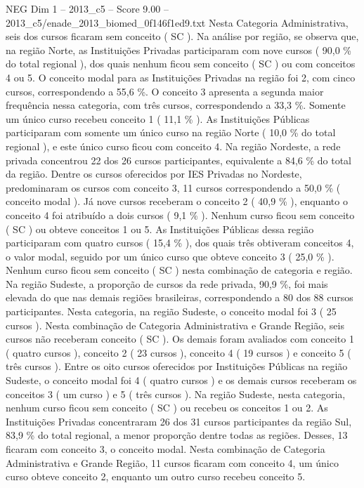 \begin{textsample}{NEG Dim 1 – 2013\_c5 – Score 9.00 – 2013\_c5/enade\_2013\_biomed\_0f146f1ed9.txt}
Nesta Categoria Administrativa, seis dos cursos ficaram sem conceito ( SC ).
Na análise por região, se observa que, na região Norte, as Instituições Privadas participaram com nove cursos ( 90,0 \% do total regional ), dos quais nenhum ficou sem conceito ( SC ) ou com conceitos 4 ou 5.
O conceito modal para as Instituições Privadas na região foi 2, com cinco cursos, correspondendo a 55,6 \%.
O conceito 3 apresenta a segunda maior frequência nessa categoria, com três cursos, correspondendo a 33,3 \%.
Somente um único curso recebeu conceito 1 ( 11,1 \% ).
As Instituições Públicas participaram com somente um único curso na região Norte ( 10,0 \% do total regional ), e este único curso ficou com conceito 4.
Na região Nordeste, a rede privada concentrou 22 dos 26 cursos participantes, equivalente a 84,6 \% do total da região.
Dentre os cursos oferecidos por IES Privadas no Nordeste, predominaram os cursos com conceito 3, 11 cursos correspondendo a 50,0 \% ( conceito modal ).
Já nove cursos receberam o conceito 2 ( 40,9 \% ), enquanto o conceito 4 foi atribuído a dois cursos ( 9,1 \% ).
Nenhum curso ficou sem conceito ( SC ) ou obteve conceitos 1 ou 5.
As Instituições Públicas dessa região participaram com quatro cursos ( 15,4 \% ), dos quais três obtiveram conceitos 4, o valor modal, seguido por um único curso que obteve conceito 3 ( 25,0 \% ).
Nenhum curso ficou sem conceito ( SC ) nesta combinação de categoria e região.
Na região Sudeste, a proporção de cursos da rede privada, 90,9 \%, foi mais elevada do que nas demais regiões brasileiras, correspondendo a 80 dos 88 cursos participantes.
Nesta categoria, na região Sudeste, o conceito modal foi 3 ( 25 cursos ).
Nesta combinação de Categoria Administrativa e Grande Região, seis cursos não receberam conceito ( SC ).
Os demais foram avaliados com conceito 1 ( quatro cursos ), conceito 2 ( 23 cursos ), conceito 4 ( 19 cursos ) e conceito 5 ( três cursos ).
Entre os oito cursos oferecidos por Instituições Públicas na região Sudeste, o conceito modal foi 4 ( quatro cursos ) e os demais cursos receberam os conceitos 3 ( um curso ) e 5 ( três cursos ).
Na região Sudeste, nesta categoria, nenhum curso ficou sem conceito ( SC ) ou recebeu os conceitos 1 ou 2.
As Instituições Privadas concentraram 26 dos 31 cursos participantes da região Sul, 83,9 \% do total regional, a menor proporção dentre todas as regiões.
Desses, 13 ficaram com conceito 3, o conceito modal.
Nesta combinação de Categoria Administrativa e Grande Região, 11 cursos ficaram com conceito 4, um único curso obteve conceito 2, enquanto um outro curso recebeu conceito 5.

\end{textsample}
